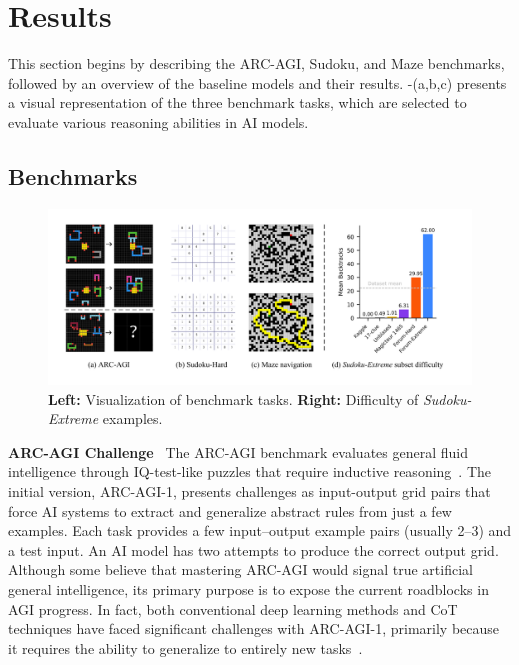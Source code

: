 \section{Results}

This section begins by describing the ARC-AGI, Sudoku, and Maze benchmarks, followed by an overview of the baseline models and their results. -(a,b,c) presents a visual representation of the three benchmark tasks, which are selected to evaluate various reasoning abilities in AI models.

\subsection{Benchmarks}

\begin{figure}[t]
    \centering
    \includegraphics[width=1\linewidth]{figures/benchmark_bars/dataset_intro.pdf}
    \caption{\textbf{Left:} Visualization of benchmark tasks. \textbf{Right:} Difficulty of \textit{Sudoku-Extreme} examples.}
    \label{fig:benchmark_intro}
\end{figure}


\textbf{ARC-AGI Challenge}~ The ARC-AGI benchmark evaluates general fluid intelligence through IQ-test-like puzzles that require inductive reasoning~\cite{AbstractionReasoning2019}. The initial version, ARC-AGI-1, presents challenges as input-output grid pairs that force AI systems to extract and generalize abstract rules from just a few examples. Each task provides a few input–output example pairs (usually 2–3) and a test input. An AI model has two attempts to produce the correct output grid. Although some believe that mastering ARC-AGI would signal true artificial general intelligence, its primary purpose is to expose the current roadblocks in AGI progress. In fact, both conventional deep learning methods and CoT techniques have faced significant challenges with ARC-AGI-1, primarily because it requires the ability to generalize to entirely new tasks~\citep{Chollet2024ARCP2}.

